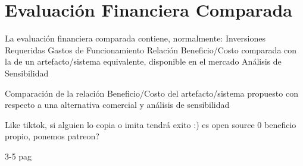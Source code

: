 \chapter{Evaluación Financiera Comparada}



La evaluación financiera comparada
contiene, normalmente:
Inversiones Requeridas
Gastos de Funcionamiento
Relación Beneficio/Costo comparada
con la de un artefacto/sistema
equivalente, disponible en el mercado
Análisis de Sensibilidad



Comparación de la relación Beneficio/Costo del
artefacto/sistema propuesto con respecto a una
alternativa comercial y análisis de sensibilidad


Like tiktok, si alguien lo copia o imita tendrá exito :) 
es open source 0 beneficio propio, ponemos patreon?

3-5 pag